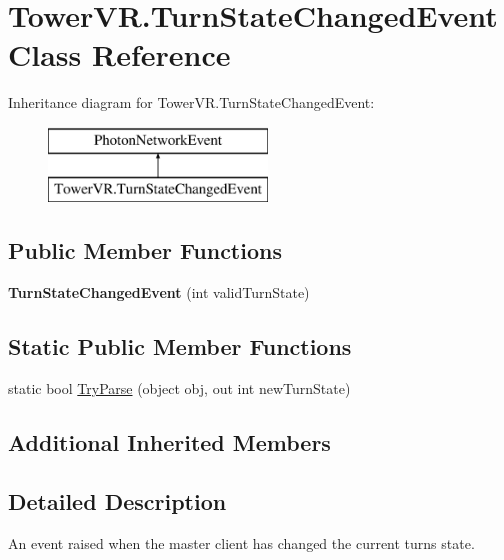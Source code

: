\hypertarget{class_tower_v_r_1_1_turn_state_changed_event}{}\section{Tower\+V\+R.\+Turn\+State\+Changed\+Event Class Reference}
\label{class_tower_v_r_1_1_turn_state_changed_event}
Inheritance diagram for Tower\+V\+R.\+Turn\+State\+Changed\+Event\+:\begin{figure}[H]
\begin{center}
\leavevmode
\includegraphics[height=2.000000cm]{class_tower_v_r_1_1_turn_state_changed_event}
\end{center}
\end{figure}
\subsection*{Public Member Functions}
\begin{DoxyCompactItemize}
\item 
{\bfseries Turn\+State\+Changed\+Event} (int valid\+Turn\+State)\hypertarget{class_tower_v_r_1_1_turn_state_changed_event_a52ab33a4e06c8e369f475917625e1ad1}{}\label{class_tower_v_r_1_1_turn_state_changed_event_a52ab33a4e06c8e369f475917625e1ad1}

\end{DoxyCompactItemize}
\subsection*{Static Public Member Functions}
\begin{DoxyCompactItemize}
\item 
static bool \hyperlink{class_tower_v_r_1_1_turn_state_changed_event_af2a87f4c766ea138684caf2a79efeed7}{Try\+Parse} (object obj, out int new\+Turn\+State)
\end{DoxyCompactItemize}
\subsection*{Additional Inherited Members}


\subsection{Detailed Description}
An event raised when the master client has changed the current turn\textquotesingle{}s state. 

